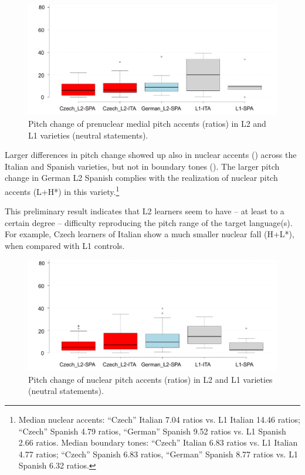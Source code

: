 \begin{figure}[p]
\includegraphics[width=\textwidth]{figures/Figure_21.pdf}
\caption{Pitch change of prenuclear medial pitch accents (ratios) in L2 and L1 varieties (neutral statements).}
\label{fig:4.21}
\end{figure}

Larger differences in pitch change showed up also in nuclear accents () across the Italian and Spanish varieties, but not in boundary tones (). The larger pitch change in German L2 Spanish complies with the realization of nuclear pitch accents (L+H*) in this variety.\footnote{Median nuclear accents: “Czech” Italian 7.04 ratios vs. L1 Italian 14.46 ratios; “Czech” Spanish 4.79 ratios, “German” Spanish 9.52 ratios vs. L1 Spanish 2.66 ratios. Median boundary tones: “Czech” Italian 6.83 ratios vs. L1 Italian 4.77 ratios; “Czech” Spanish 6.83 ratios, “German” Spanish 8.77 ratios vs. L1 Spanish 6.32 ratios.}


This preliminary result indicates that L2 learners seem to have -- at least to a certain degree -- difficulty reproducing the pitch range of the target language(s). For example, Czech learners of Italian show a much smaller nuclear fall (H+L*), when compared with L1 controls.


\begin{figure}


\includegraphics[width=\textwidth]{figures/Figure_22.pdf}



\caption{Pitch change of nuclear pitch accents (ratios) in L2 and L1 varieties (neutral statements).}
\label{fig:4.22}
\end{figure}

